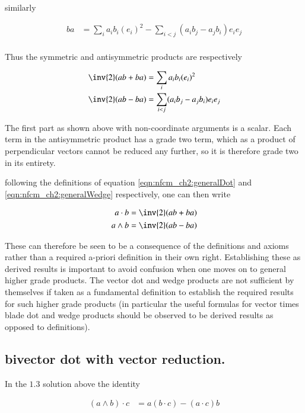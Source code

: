 similarly

\begin{align*}
b a &= \sum_{i} a_i b_i (e_i)^2 - \sum_{i < j} (a_i b_j - a_j b_i) e_i e_j  \\
\end{align*}

Thus the symmetric and antisymmetric products are respectively

\begin{align*}
\inv{2}(a b + b a) &= \sum_{i} a_i b_i (e_i)^2 \\
\inv{2}(a b - b a) &= \sum_{i < j} (a_i b_j - a_j b_i) e_i e_j  \\
\end{align*}

The first part as shown above with non-coordinate arguments is a scalar.  Each term in the antisymmetric product has a grade two term, which
as a product of perpendicular vectors cannot be reduced any further, so it is therefore grade two in its entirety.

following the definitions of equation \ref{eqn:nfcm_ch2:generalDot} and \ref{eqn:nfcm_ch2:generalWedge} respectively, one can then write

\begin{align}
a \cdot b &= \inv{2}(a b + b a) \\
a \wedge b &= \inv{2}(a b - b a)
\end{align}

These can therefore be seen to be a consequence of the definitions and axioms rather than a required a-priori definition in their own right.  Establishing
these as derived results is important to avoid confusion when one moves on to general higher grade products.  The vector dot and wedge products are
not sufficient by themselves if taken as a fundamental definition to establish the required results for such higher grade products (in particular the useful
formulas for vector times blade dot and wedge products should be observed to be derived results as opposed to definitions).

\subsection{bivector dot with vector reduction. }

In the $1.3$ solution above the identity

\begin{align}
(a \wedge b) \cdot c &= a (b \cdot c) - (a \cdot c) b \\
\end{align}

